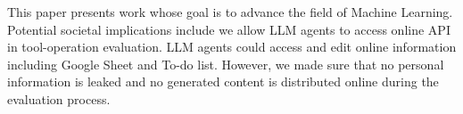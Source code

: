 This paper presents work whose goal is to advance the field of Machine Learning. Potential societal implications include we allow LLM agents to access online API in tool-operation evaluation. LLM agents could access and edit online information including Google Sheet and To-do list. However, we made sure that no personal information is leaked and no generated content is distributed online during the evaluation process.
